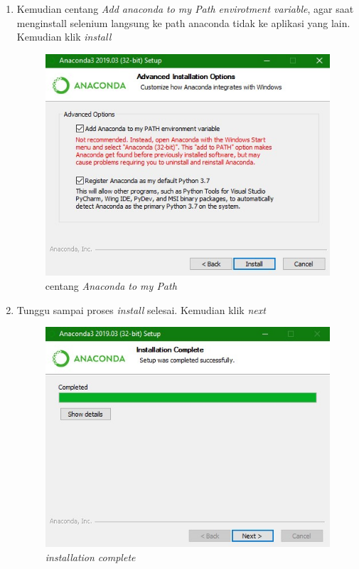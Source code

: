 \begin{enumerate}
\item Kemudian centang \textit{Add anaconda to my Path envirotment variable}, agar saat menginstall selenium langsung ke path anaconda tidak ke aplikasi yang lain. Kemudian klik \textit{install}

\begin{figure}[H]
    \centering
    \includegraphics[scale=0.5]{figures/f}
    \caption{centang \textit{Anaconda to my Path}}
    \label{Figureanaconda4}
\end{figure}


\item Tunggu sampai proses \textit{install} selesai. Kemudian klik \textit{next}

\begin{figure}[H]
    \centering
    \includegraphics[scale=0.5]{figures/g}
    \caption{\textit{installation complete}}
    \label{Figureanaconda5}
\end{figure}


\end{enumerate}
